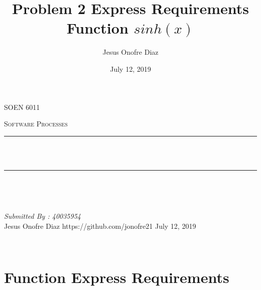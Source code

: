 \documentclass[12pt]{report}
\title{Problem 2 Express Requirements Function $sinh(x)$ }
\author{Jesus Onofre Diaz}
\date{July 12, 2019}
\makeatletter
\let\thetitle\@title
\makeatother
\begin{document}

\begin{titlepage}
	\centering
    \vspace*{0.5 cm}
\begin{center}    \textsc{\Large   SOEN 6011}\\[2.0 cm]	\end{center}%
	\textsc{\Large Software Processes }\\[0.5 cm]				%
	\rule{\linewidth}{0.2 mm} \\[0.4 cm]
	{ \huge \bfseries \thetitle}\\
	\rule{\linewidth}{0.2 mm} \\[1.5 cm]
	
	\begin{minipage}{0.4\textwidth}
		\begin{flushleft} \large
			\end{flushleft}
			\end{minipage}~
			\begin{minipage}{0.4\textwidth}
            
			\begin{flushright} \large
			\emph{Submitted By : 40035954} \\
		Jesus Onofre Diaz
		https://github.com/jonofre21
		\break
			July 12, 2019
		\end{flushright}
	
           
	\end{minipage}\\[2 cm]
	

\end{titlepage}


\tableofcontents
\pagebreak

\renewcommand{\thesection}{\arabic{section}}
\section{Function Express Requirements}
 
\end{document}
